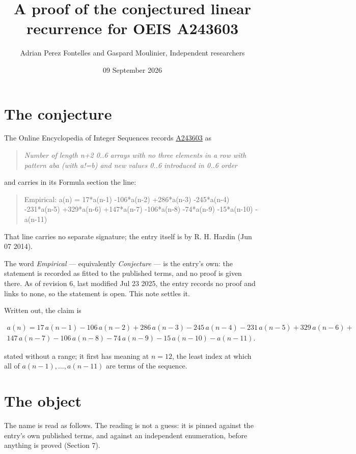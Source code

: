 \documentclass[11pt]{article}
\title{A proof of the conjectured linear recurrence for OEIS A243603}
\author{Adrian Perez Fontelles and Gaspard Moulinier, Independent researchers}
\date{09 September 2026}
\theoremstyle{definition}
\begin{document}
\maketitle
\section{The conjecture}

The Online Encyclopedia of Integer Sequences records \href{https://oeis.org/A243603}{A243603} as

\begin{quote}\itshape Number of length n+2 0..6 arrays with no three elements in a row with pattern aba (with a!=b) and new values 0..6 introduced in 0..6 order\end{quote}

and carries in its Formula section the line:

\begin{quote}\ttfamily Empirical: a(n) = 17*a(n-1) -106*a(n-2) +286*a(n-3) -245*a(n-4) -231*a(n-5) +329*a(n-6) +147*a(n-7) -106*a(n-8) -74*a(n-9) -15*a(n-10) -a(n-11)\end{quote}

That line carries no separate signature; the entry itself is by R. H. Hardin (Jun 07 2014).

The word {\itshape Empirical} --- equivalently {\itshape Conjecture} --- is the entry's own: the statement is recorded as fitted to the published terms, and no proof is given there. As of revision 6, last modified Jul 23 2025, the entry records no proof and links to none, so the statement is open. This note settles it.

Written out, the claim is

\begin{multline*} a(n) = 17\,a(n-1) - 106\,a(n-2) + 286\,a(n-3) - 245\,a(n-4) - 231\,a(n-5) + 329\,a(n-6) + \\ 147\,a(n-7) - 106\,a(n-8) - 74\,a(n-9) - 15\,a(n-10) - a(n-11). \end{multline*}

stated without a range; it first has meaning at $n = 12$, the least index at which all of $a(n-1),\dots,a(n-11)$ are terms of the sequence.

\section{The object}

The name is read as follows. The reading is not a guess: it is pinned against the entry's own published terms, and against an independent enumeration, before anything is proved (Section 7).
\end{document}
